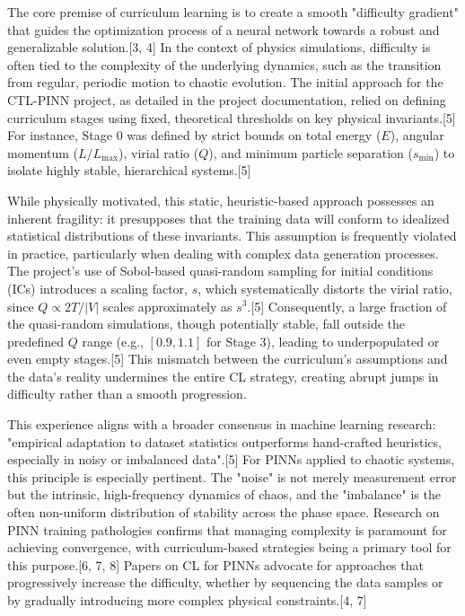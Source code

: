 \documentclass[11pt, letterpaper]{article}
\begin{document}
The core premise of curriculum learning is to create a smooth "difficulty gradient" that guides the optimization process of a neural network towards a robust and generalizable solution.[3, 4] In the context of physics simulations, difficulty is often tied to the complexity of the underlying dynamics, such as the transition from regular, periodic motion to chaotic evolution. The initial approach for the CTL-PINN project, as detailed in the project documentation, relied on defining curriculum stages using fixed, theoretical thresholds on key physical invariants.[5] For instance, Stage 0 was defined by strict bounds on total energy ($E$), angular momentum ($L/L_{\text{max}}$), virial ratio ($Q$), and minimum particle separation ($s_{\text{min}}$) to isolate highly stable, hierarchical systems.[5]

While physically motivated, this static, heuristic-based approach possesses an inherent fragility: it presupposes that the training data will conform to idealized statistical distributions of these invariants. This assumption is frequently violated in practice, particularly when dealing with complex data generation processes. The project's use of Sobol-based quasi-random sampling for initial conditions (ICs) introduces a scaling factor, $s$, which systematically distorts the virial ratio, since $Q \propto 2T/|V|$ scales approximately as $s^3$.[5] Consequently, a large fraction of the quasi-random simulations, though potentially stable, fall outside the predefined $Q$ range (e.g., $[0.9, 1.1]$ for Stage 3), leading to underpopulated or even empty stages.[5] This mismatch between the curriculum's assumptions and the data's reality undermines the entire CL strategy, creating abrupt jumps in difficulty rather than a smooth progression.

This experience aligns with a broader consensus in machine learning research: "empirical adaptation to dataset statistics outperforms hand-crafted heuristics, especially in noisy or imbalanced data".[5] For PINNs applied to chaotic systems, this principle is especially pertinent. The "noise" is not merely measurement error but the intrinsic, high-frequency dynamics of chaos, and the "imbalance" is the often non-uniform distribution of stability across the phase space. Research on PINN training pathologies confirms that managing complexity is paramount for achieving convergence, with curriculum-based strategies being a primary tool for this purpose.[6, 7, 8] Papers on CL for PINNs advocate for approaches that progressively increase the difficulty, whether by sequencing the data samples or by gradually introducing more complex physical constraints.[4, 7]
\end{document}
